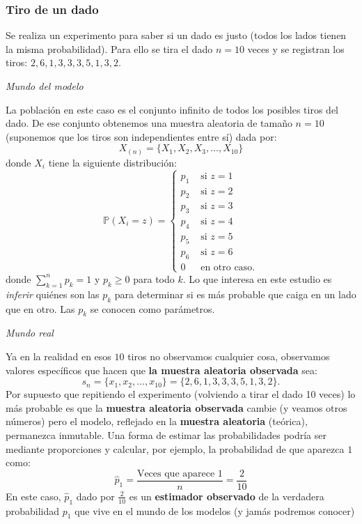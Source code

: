 \documentclass[
]{book}
\newenvironment{Ejemplo}
{\begin{mdframed}[
  linecolor=ejemplocolor,
  skipabove=12pt,
  skipbelow=12pt,
  roundcorner=20pt,
  splittopskip=2\topsep]}
{\end{mdframed}}
\begin{document}
\begin{Ejemplo}
\hypertarget{tiro-de-un-dado}{%
\subsubsection{Tiro de un dado}\label{tiro-de-un-dado}}

Se realiza un experimento para saber si un dado es justo (todos los
lados tienen la misma probabilidad). Para ello se tira el dado
\(n = 10\) veces y se registran los tiros: \(2,6,1,3,3,3,5,1,3,2\).

\emph{Mundo del modelo}

La población en este caso es el conjunto infinito de todos los posibles
tiros del dado. De ese conjunto obtenemos una muestra aleatoria de
tamaño \(n = 10\) (suponemos que los tiros son independientes entre sí)
dada por: \[
X_{(n)} = \{ X_1, X_2, X_3, \dots, X_{10}\}
\] donde \(X_i\) tiene la siguiente distribución: \[
\mathbb{P}(X_i = z) = 
\begin{cases}
p_1 & \text{ si } z = 1 \\
p_2 & \text{ si } z = 2 \\
p_3 & \text{ si } z = 3 \\
p_4 & \text{ si } z = 4 \\
p_5 & \text{ si } z = 5 \\
p_6 & \text{ si } z = 6 \\
0 & \text{ en otro caso.}
\end{cases}
\] donde \(\sum_{k = 1}^n p_k = 1\) y \(p_{k} \geq 0\) para todo \(k\).
Lo que interesa en este estudio es \emph{inferir} quiénes son las
\(p_k\) para determinar si es más probable que caiga en un lado que en
otro. Las \(p_k\) se conocen como parámetros.

\emph{Mundo real}

Ya en la realidad en esos \(10\) tiros no observamos cualquier cosa,
observamos valores específicos que hacen que \textbf{la muestra
aleatoria observada} sea: \[
s_n = \{x_1, x_2, \dots, x_10 \} = \{2,6,1,3,3,3,5,1,3,2\}.
\] Por supuesto que repitiendo el experimento (volviendo a tirar el dado
10 veces) lo más probable es que la \textbf{muestra aleatoria observada}
cambie (y veamos otros números) pero el modelo, reflejado en la
\textbf{muestra aleatoria} (teórica), permanezca inmutable. Una forma de
estimar las probabilidades podría ser mediante proporciones y calcular,
por ejemplo, la probabilidad de que aparezca \(1\) como: \[
\hat{p}_1 = \frac{\text{Veces que aparece 1}}{n} = \frac{2}{10}
\] En este caso, \(\hat{p}_1\) dado por \(\frac{2}{10}\) es un
\textbf{estimador observado} de la verdadera probabilidad \(p_1\) que
vive en el mundo de los modelos (y jamás podremos conocer)
\end{Ejemplo}
\end{document}
